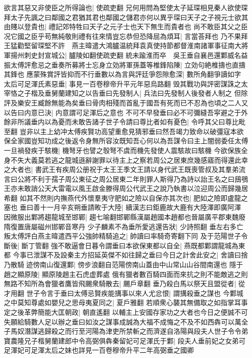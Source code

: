 欲言其惡又非使臣之所得論也|{
	使疏吏翻}
兄何用問為堅使太子延琛相見秦人欲使琛拜太子先諷之曰鄰國之君猶其君也鄰國之儲君亦何以異乎琛曰天子之子視元士欲其由賤以登貴也|{
	禮記郊特牲曰天子之元子士也天下無生而貴者也}
尚不敢臣其父之臣况它國之臣乎苟無純敬則禮有往來情豈忘恭但恐降屈為煩耳|{
	言當荅拜也}
乃不果拜王猛勸堅留琛堅不許　燕主暐遣大鴻臚温統拜袁真使持節都督淮南諸軍事征南大將軍揚州刺史封宣城公|{
	臚陵如翻使疏吏翻}
統未踰淮而卒　吳王垂自襄邑還鄴威名益振太傅評愈忌之垂奏所募將士忘身立効將軍孫蓋等椎鋒陷陳|{
	立効句絶椎擣也直擣其鋒也}
應蒙殊賞評皆抑而不行垂數以為言與評廷爭怨隙愈深|{
	數所角翻爭讀如字}
太后可足渾氏素惡垂|{
	事見一百卷穆帝升平元年惡烏路翻}
毁其戰功與評密謀誅之太宰恪之子楷及垂舅蘭建知之以告垂曰先發制人|{
	兵法曰先發制人後發者人制之}
但除評及樂安王臧餘無能為矣垂曰骨肉相殘而首亂于國吾有死而已不忍為也頃之二人又以告曰内意已決|{
	内意謂可足渾后之意也}
不可不早發垂曰必不可彌縫吾寜避之于外餘非所議垂内以為憂而未敢告諸子世子令請曰尊比者如有憂色|{
	令呼其父曰尊比毗至翻}
豈非以主上幼冲太傅疾賢功高望重愈見猜邪垂曰然吾竭力致命以破彊寇本欲保全家國豈知功成之後返令身無所容汝既知吾心何以為吾謀令曰主上闇弱委任太傅一旦禍發疾于駭機|{
	機弩牙也譬之彀弩不虞而機先發使人震駭故曰駭機}
今欲保族全身不失大義莫若逃之龍城遜辭謝罪以待主上之察若周公之居東庶幾感寤而得還此幸之大者也|{
	書武王有疾周公册祝于太王王季文王請以身代武王既喪管叔及其羣弟流言曰公將不利于孺子周公東征之周公居東二年則罪人斯得乃為詩以詒王名之曰䲭鴞王亦未敢誚公天大雷電以風王啟金滕得周公代武王之說乃執書以泣迎周公而歸幾居希翻}
如其不然則内撫燕代外懷羣夷守肥如之險以自保亦其次也|{
	肥如之險即盧龍之塞也}
垂曰善十一月辛亥朔垂請畋于大陸|{
	續漢志曰鉅鹿故大鹿有大陸澤即廣阿澤}
因微服出鄴將趨龍城至邯鄲|{
	趨七喻翻邯鄲縣漢屬趙國本趙都也晉屬廣平郡東魏廢隋復置唐屬磁州邯鄲音寒丹}
少子麟素不為垂所愛逃還告狀|{
	少詩照翻}
垂左右多亡叛太傅評白燕主暐遣西平公強帥精騎追之|{
	帥讀曰率騎奇寄翻下同}
及于范陽世子令斷後|{
	斷丁管翻}
強不敢逼會日暮令謂垂曰本欲保東都以自全|{
	燕既都鄴謂龍城為東都}
今事已泄謀不及設秦主方招延英傑不如往歸之垂曰今日之計舍此安之|{
	舍讀曰捨}
乃散騎迹傍南山復還鄴|{
	傍步浪翻自范陽傍南山蓋由中山常山山谷間南還也}
隱于趙之顯原陵|{
	顯原陵趙主石虎虚葬處}
俄有獵者數百騎四面而來抗之則不能敵逃之則無路不知所為會獵者鷹皆飛颺衆騎散去|{
	颺戶章翻}
垂乃殺白馬以祭天且盟從者|{
	從才用翻}
世子令言于垂曰太傅忌賢疾能搆事以來人尤忿恨|{
	謂搆殺垂之謀也}
今鄴城之中莫知尊處如嬰兒之思母夷夏同之|{
	夏戶雅翻}
若順衆心襲其無備取之如指掌耳事定之後革弊簡能大匡朝政|{
	朝直遙翻}
以輔主上安國存家功之大者也今日之便誠不可失願給騎數人足以辦之垂曰如汝之謀事成誠為大福不成悔之不及不如西犇可以萬全子馬奴潛謀逃歸殺之而行至河陽為津吏所禁斬之而濟遂自洛陽與段夫人世子令令弟寶農隆兄子楷舅蘭建郎中令高弼俱犇秦留妃可足渾氏于鄴|{
	段夫人垂前妃之女弟可足渾妃可足渾太后之妹也詳見一百卷穆帝升平二年高弼垂之國卿}

